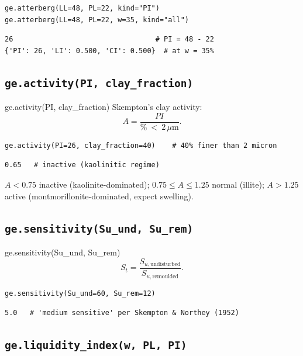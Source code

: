 \documentclass[11pt,a4paper,openany]{book}
\begin{document}
\begin{lstlisting}
ge.atterberg(LL=48, PL=22, kind="PI")
ge.atterberg(LL=48, PL=22, w=35, kind="all")
\end{lstlisting}
\begin{lstlisting}[style=output]
26                                  # PI = 48 - 22
{'PI': 26, 'LI': 0.500, 'CI': 0.500}  # at w = 35%
\end{lstlisting}

\subsection{\texttt{ge.activity(PI, clay\_fraction)}}

\begin{funcbox}{ge.activity(PI, clay\_fraction)}
Skempton's clay activity:
\[
A = \frac{PI}{\%~<~2\,\mu\text{m}}.
\]
\end{funcbox}

\begin{lstlisting}
ge.activity(PI=26, clay_fraction=40)    # 40% finer than 2 micron
\end{lstlisting}
\begin{lstlisting}[style=output]
0.65   # inactive (kaolinitic regime)
\end{lstlisting}

\begin{tipbox}
$A < 0.75$ inactive (kaolinite-dominated);
$0.75 \leq A \leq 1.25$ normal (illite);
$A > 1.25$ active (montmorillonite-dominated, expect swelling).
\end{tipbox}

\subsection{\texttt{ge.sensitivity(Su\_und, Su\_rem)}}

\begin{funcbox}{ge.sensitivity(Su\_und, Su\_rem)}
\[
S_t = \frac{S_{u,\text{undisturbed}}}{S_{u,\text{remoulded}}}.
\]
\end{funcbox}

\begin{lstlisting}
ge.sensitivity(Su_und=60, Su_rem=12)
\end{lstlisting}
\begin{lstlisting}[style=output]
5.0   # 'medium sensitive' per Skempton & Northey (1952)
\end{lstlisting}

\subsection{\texttt{ge.liquidity\_index(w, PL, PI)}}
\end{document}
